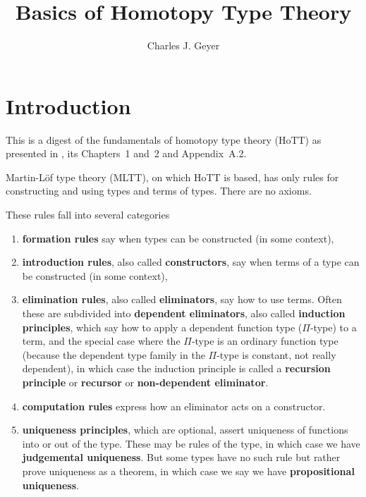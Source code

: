 \documentclass[11pt]{article}
\begin{document}
\title{Basics of Homotopy Type Theory}

\author{Charles J. Geyer}

\maketitle

\section{Introduction}

This is a digest of the fundamentals of homotopy type theory (HoTT)
as presented in
\citet[hereinafter referred to as the HoTT book]{hott-book},
its Chapters~1 and~2 and Appendix~A.2.

Martin-L\"{o}f type theory (MLTT), on which HoTT is based, has only
rules for constructing and using types and terms of types.
There are no axioms.

These rules fall into several categories 
\begin{enumerate}
\item[(i)] \textbf{formation rules} say when types can be constructed
    (in some context),
\item[(ii)] \textbf{introduction rules}, also called \textbf{constructors},
    say when terms of a type can be constructed (in some context),
\item[(iii)] \textbf{elimination rules}, also called \textbf{eliminators},
    say how to use terms.  Often these are subdivided into \textbf{dependent
    eliminators}, also called \textbf{induction principles}, which say how
    to apply a dependent function type ($\Pi$-type) to a term,
    and the special case where
    the $\Pi$-type is an ordinary function type (because the dependent type
    family in the $\Pi$-type is constant, not really dependent), in which
    case the induction principle is called a \textbf{recursion principle}
    or \textbf{recursor} or \textbf{non-dependent eliminator}.
\item[(iv)] \textbf{computation rules} express how an eliminator acts on
    a constructor.
\item[(v)] \textbf{uniqueness principles}, which are optional,
    assert uniqueness of functions into or out of the type.
    These may be rules of the type, in which case we have
    \textbf{judgemental uniqueness}.  But some types
    have no such rule but rather prove uniqueness as a theorem, in which
    case we say we have \textbf{propositional uniqueness}.
\end{enumerate}
\end{document}

